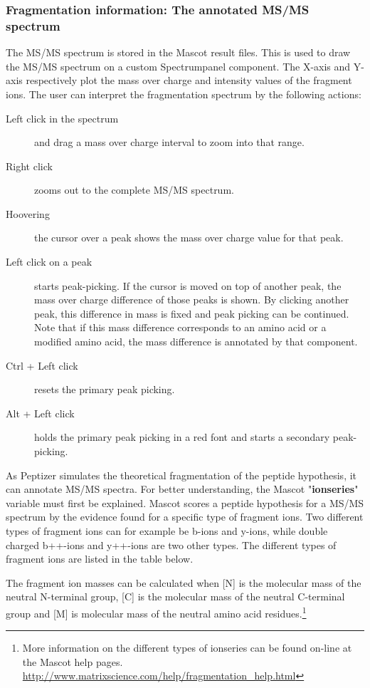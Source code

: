 \subsubsection{Fragmentation information: The annotated MS/MS spectrum}
\npar The MS/MS spectrum is stored in the Mascot result files. This is used to draw the MS/MS spectrum on a custom Spectrumpanel component. The X-axis and Y-axis respectively plot the mass over charge and intensity values of the fragment ions. The user can interpret the fragmentation spectrum by the following actions:
\begin{description}
	\item[Left click in the spectrum ]and drag a mass over charge interval to zoom into that range.
	\item[Right click ] zooms out to the complete MS/MS spectrum.
	\item[Hoovering] the cursor over a peak shows the mass over charge value for that peak.
	\item[Left click on a peak] starts peak-picking. If the cursor is moved on top of another peak, the mass over charge difference of those peaks is shown. By clicking another peak, this difference in mass is fixed and peak picking can be continued. Note that if this mass difference corresponds to an amino acid or a modified amino acid, the mass difference is annotated by that component.
	\item[Ctrl + Left click] resets the primary peak picking.
	\item[Alt + Left click] holds the primary peak picking in a red font and starts a secondary peak-picking.
\end{description}
%
\npar As Peptizer simulates the theoretical fragmentation of the peptide hypothesis, it can annotate MS/MS spectra.
\npar For better understanding, the Mascot "\textbf{ionseries}" variable must first be explained. Mascot scores a peptide hypothesis for a MS/MS spectrum by the evidence found for a specific type of fragment ions. Two different types of fragment ions can for example be b-ions and y-ions, while double charged b++-ions and y++-ions are two other types. The different types of fragment ions are listed in the table below.

\npar The fragment ion masses can be calculated when [N] is the molecular mass of the neutral N-terminal group, [C] is the molecular mass of the neutral C-terminal group and [M] is molecular mass of the neutral amino acid residues.\footnote{More information on the different types of ionseries can be found on-line at the Mascot help pages. \url{http://www.matrixscience.com/help/fragmentation_help.html}}
